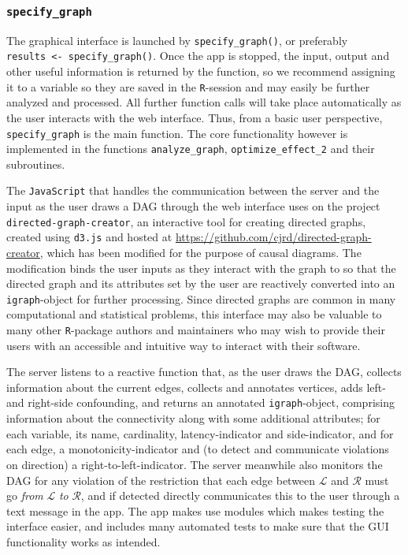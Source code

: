 \hypertarget{specify_graph}{%
\subsubsection{\texorpdfstring{\texttt{specify\_graph}}{specify\_graph}}\label{specify_graph}}

The graphical interface is launched by \texttt{specify\_graph()}, or preferably\\
\texttt{results\ \textless{}-\ specify\_graph()}. Once the  app is stopped, the input, output and other useful information is returned by the function, so we recommend assigning it to a variable so they are saved in the \texttt{R}-session and may easily be further analyzed and processed. All further function calls will take place automatically as the user interacts with the web interface. Thus, from a basic user perspective, \texttt{specify\_graph} is the main function. The core functionality however is implemented in the functions \texttt{analyze\_graph}, \texttt{optimize\_effect\_2} and their subroutines.

The \texttt{JavaScript} that handles the communication between the  server and the input as the user draws a DAG through the web interface uses on the project\\
\texttt{directed-graph-creator}, an interactive tool for creating directed graphs, created using \texttt{d3.js} and hosted at \url{https://github.com/cjrd/directed-graph-creator}, which has been modified for the purpose of causal diagrams. The modification binds the user inputs as they interact with the graph to  so that the directed graph and its attributes set by the user are reactively converted into an \texttt{igraph}-object for further processing. Since directed graphs are common in many computational and statistical problems, this  interface may also be valuable to many other \texttt{R}-package authors and maintainers who may wish to provide their users with an accessible and intuitive way to interact with their software.

The server listens to a reactive function that, as the user draws the DAG, collects information about the current edges, collects and annotates vertices, adds left- and right-side confounding, and returns an annotated \texttt{igraph}-object, comprising information about the connectivity along with some additional attributes; for each variable, its name, cardinality, latency-indicator and side-indicator, and for each edge, a monotonicity-indicator and (to detect and communicate violations on direction) a right-to-left-indicator. The server meanwhile also monitors the DAG for any violation of the restriction that each edge between \(\mathcal{L}\) and \(\mathcal{R}\) must go \emph{from} \(\mathcal{L}\) \emph{to} \(\mathcal{R}\), and if detected directly communicates this to the user through a text message in the  app. The app makes use  modules which makes testing the interface easier, and  includes many automated tests to make sure that the GUI functionality works as intended.

